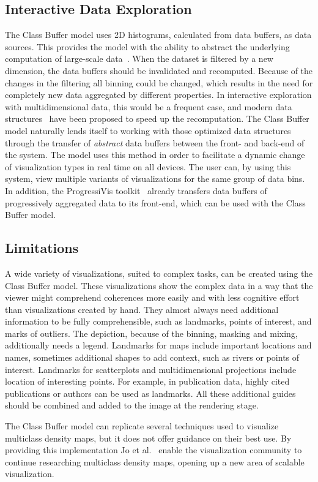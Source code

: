\subsection{Interactive Data Exploration}

The Class Buffer model uses 2D histograms, calculated from data buffers, as data sources. This provides the model with the ability to abstract the underlying computation of large-scale data~\cite{jo2019declarative}.
When the dataset is filtered by a new dimension, the data buffers should be invalidated and recomputed. Because of the changes in the filtering all binning could be changed, which results in the need for completely new data aggregated by different properties. 
In interactive exploration with multidimensional data, this would be a frequent case, and modern data structures~\cite{lins2013nanocubes, liu2013immens} have been proposed to speed up the recomputation. The Class Buffer model naturally lends itself to working with those optimized data structures through the transfer of \textit{abstract} data buffers between the front- and back-end of the system. The model uses this method in order to facilitate a dynamic change of visualization types in real time on all devices. The user can, by using this system, view multiple variants of visualizations for the same group of data bins.\\ 
In addition, the ProgressiVis toolkit~\cite{fekete2016progressive} already transfers data buffers of progressively aggregated data to its front-end, which can be used with the Class Buffer model.


\subsection{Limitations}

A wide variety of visualizations, suited to complex tasks, can be created using the Class Buffer model. These visualizations show the complex data in a way that the viewer might comprehend coherences more easily and with less cognitive effort than visualizations created by hand. They almost always need additional information to be fully comprehensible, such as landmarks, points of interest, and marks of outliers. The depiction, because of the binning, masking and mixing, additionally needs a legend.
Landmarks for maps include important locations and names, sometimes additional shapes to add context, such as rivers or points of interest. Landmarks for scatterplots and multidimensional projections include location of interesting points.
For example, in publication data, highly cited publications or authors can be used as landmarks.
All these additional guides should be combined and added to the image at the rendering stage.

The Class Buffer model can replicate several techniques used to visualize multiclass density maps, but it does not offer guidance on their best use. 
By providing this implementation Jo et al.~\cite{jo2019declarative} enable the visualization community to continue researching multiclass density maps, opening up a new area of scalable visualization. 

